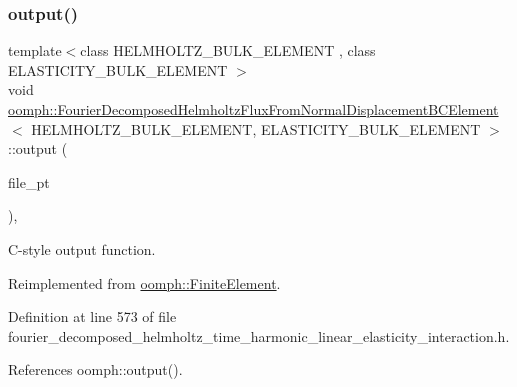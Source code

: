 \subsubsection{\texorpdfstring{output()}{output()}\hspace{0.1cm}{\footnotesize\ttfamily [3/4]}}
{\footnotesize\ttfamily template$<$class H\+E\+L\+M\+H\+O\+L\+T\+Z\+\_\+\+B\+U\+L\+K\+\_\+\+E\+L\+E\+M\+E\+NT , class E\+L\+A\+S\+T\+I\+C\+I\+T\+Y\+\_\+\+B\+U\+L\+K\+\_\+\+E\+L\+E\+M\+E\+NT $>$ \\
void \hyperlink{classoomph_1_1FourierDecomposedHelmholtzFluxFromNormalDisplacementBCElement}{oomph\+::\+Fourier\+Decomposed\+Helmholtz\+Flux\+From\+Normal\+Displacement\+B\+C\+Element}$<$ H\+E\+L\+M\+H\+O\+L\+T\+Z\+\_\+\+B\+U\+L\+K\+\_\+\+E\+L\+E\+M\+E\+NT, E\+L\+A\+S\+T\+I\+C\+I\+T\+Y\+\_\+\+B\+U\+L\+K\+\_\+\+E\+L\+E\+M\+E\+NT $>$\+::output (\begin{DoxyParamCaption}\item[{F\+I\+LE $\ast$}]{file\+\_\+pt }\end{DoxyParamCaption})\hspace{0.3cm}{\ttfamily [inline]}, {\ttfamily [virtual]}}



C-\/style output function. 



Reimplemented from \hyperlink{classoomph_1_1FiniteElement_a72cddd09f8ddbee1a20a1ff404c6943e}{oomph\+::\+Finite\+Element}.



Definition at line 573 of file fourier\+\_\+decomposed\+\_\+helmholtz\+\_\+time\+\_\+harmonic\+\_\+linear\+\_\+elasticity\+\_\+interaction.\+h.



References oomph\+::output().

\mbox{\label{classoomph_1_1FourierDecomposedHelmholtzFluxFromNormalDisplacementBCElement_a982a948fa62759e5cb2e7953bb891602}} 
